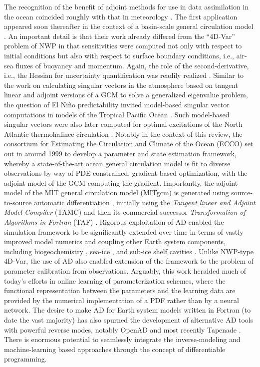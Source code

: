 The recognition of the benefit of adjoint methods for use in data assimilation in the ocean coincided roughly with that in meteorology \cite{Thacker:1988kp,Thacker:1988ed}. 
The first application appeared soon thereafter in the context of a basin-scale general circulation model \cite{Tziperman.1989,Tziperman:1992hg,Tziperman:1992jw}. 
An important detail is that their work already differed from the ``4D-Var'' problem of NWP in that sensitivities were computed not only with respect to initial conditions but also with respect to surface boundary conditions, i.e., air-sea fluxes of buoyancy and momentum.
Again, the role of the second-derivative, i.e., the Hessian for uncertainty quantification was readily realized \cite{Thacker:1989jf}.
Similar to the work on calculating singular vectors in the atmosphere based on tangent linear and adjoint versions of a GCM to solve a generalized eigenvalue problem, the question of El Ni\~no predictability invited model-based singular vector computations in models of the Tropical Pacific Ocean \cite{Moore:1997ci,Moore:1997fp}.
Such model-based singular vectors were also later computed for optimal excitations of the North Atlantic thermohalince circulation \cite{Zanna.2010,Zanna:2011ge,Zanna:2012dw}.
Notably in the context of this review, the consortium for Estimating the Circulation and Climate of the Ocean (ECCO) \cite{Stammer.2002} set out in around 1999 to develop a parameter and state estimation framework, whereby a state-of-the-art ocean general circulation model is fit to diverse observations by way of PDE-constrained, gradient-based optimization, with the adjoint model of the GCM computing the gradient.
Importantly, the adjoint model of the MIT general circulation model (MITgcm) is generated using source-to-source automatic differentiation \cite{Marotzke:1999wc,Heimbach.2005}, initially using the \textit{Tangent linear and Adjoint Model Compiler} (TAMC)\cite{Giering:1998in} and then its commercial successor \textit{Transformation of Algorithms in Fortran} (TAF) \cite{Giering.2006}.
Rigorous exploitation of AD enabled the simulation framework to be significantly extended over time in terms of vastly improved model numerics \cite{Forget.2015m9i} and coupling other Earth system components, including biogeochemistry \cite{Dutkiewicz:2006gw}, sea-ice \cite{Heimbach:2010fz}, and sub-ice shelf cavities \cite{Heimbach:2012iu}.
Unlike NWP-type 4D-Var, the use of AD also enabled extension of the framework to the problem of parameter calibration from observations\cite{Ferreira.2005,Stammer:2005dw,Liu:2012jd}. 
Arguably, this work heralded much of today's efforts in online learning of parameterization schemes, where the functional representation between the parameters and the learning data are provided by the numerical implementation of a PDF rather than by a neural network.
The desire to make AD for Earth system models written in Fortran (to date the vast majority) has also spurned the development of alternative AD tools with powerful reverse modes, notably OpenAD \cite{Utke:2008ko} and most recently Tapenade \cite{Hascoet.2013,Gaikwad.2023,Gaikwad.2024}.
There is enormous potential to seamlessly integrate the inverse-modeling and machine-learning based approaches through the concept of differentiable programming.

